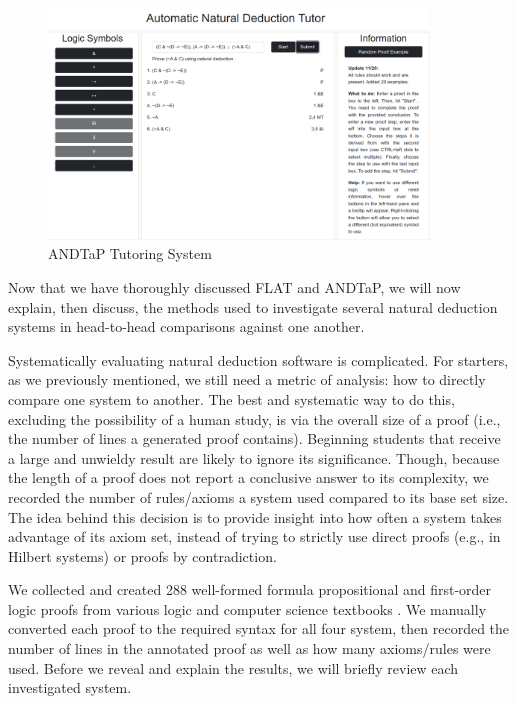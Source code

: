 \documentclass[ms]{uncgdissertationexp2}
\theoremstyle{plain}
\theoremstyle{definition}
\theoremstyle{remark}
\begin{document}
\begin{figure}[!ht]
	\centering
	\includegraphics[width=0.9\textwidth]{andtap-tutor.png}
	\caption{ANDTaP Tutoring System}
	\label{fig:andtap}
\end{figure} 

Now that we have thoroughly discussed FLAT and ANDTaP, we will now explain, then discuss, the methods used to investigate several natural deduction systems in head-to-head comparisons against one another.

Systematically evaluating natural deduction software is complicated. For starters, as we previously mentioned, we still need a metric of analysis: how to directly compare one system to another. The best and systematic way to do this, excluding the possibility of a human study, is via the overall size of a proof (i.e., the number of lines a generated proof contains). Beginning students that receive a large and unwieldy result are likely to ignore its significance. Though, because the length of a proof does not report a conclusive answer to its complexity, we recorded the number of rules/axioms a system used compared to its base set size. The idea behind this decision is to provide insight into how often a system takes advantage of its axiom set, instead of trying to strictly use direct proofs (e.g., in Hilbert systems) or proofs by contradiction. 

We collected and created 288 well-formed formula propositional and first-order logic proofs from various logic and computer science textbooks \cite{lol} \cite{heinbook} \cite{methodsoflogic}. We manually converted each proof to the required syntax for all four system, then recorded the number of lines in the annotated proof as well as how many axioms/rules were used. Before we reveal and explain the results, we will briefly review each investigated system.
\end{document}
